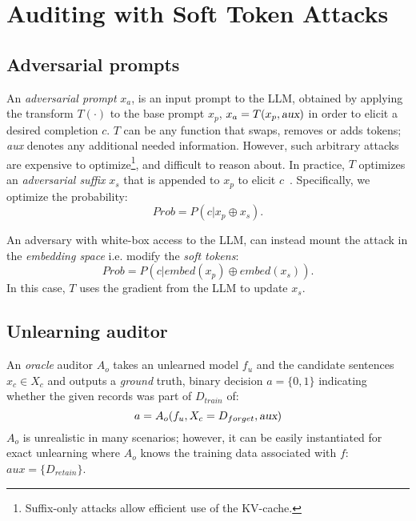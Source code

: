 \section{Auditing with Soft Token Attacks}\label{sec:method}

\subsection{Adversarial prompts}

An \emph{adversarial prompt} $x_a$, is an input prompt to the LLM, obtained by applying the transform $T(\cdot)$ to the base prompt $x_p$, $x_a = T(x_p, \textsl{aux})$ in order to elicit a desired completion $c$.
$T$ can be any function that swaps, removes or adds tokens; \textsl{aux} denotes any additional needed information.
However, such arbitrary attacks are expensive to optimize\footnote{Suffix-only attacks allow efficient use of the KV-cache.}, and difficult to reason about.
In practice, $T$ optimizes an \emph{adversarial suffix} $x_s$ that is appended to $x_p$ to elicit $c$~\cite{zou2023gcg}.
Specifically, we optimize the probability:
\begin{equation}
    Prob = P(c | x_p \oplus x_s).
\end{equation}

An adversary with white-box access to the LLM, can instead mount the attack in the \emph{embedding space} i.e. modify the \emph{soft tokens}:
\begin{equation}
    Prob = P(c | embed(x_p) \oplus embed(x_s)).
\end{equation}
In this case, $T$ uses the gradient from the LLM to update $x_s$.

\subsection{Unlearning auditor}\label{sec:method:framework}

An \emph{oracle} auditor $A_o$ takes an unlearned model $f_u$ and the candidate sentences $x_c \in X_c$ and outputs a \emph{ground} truth, binary decision $a=\{0, 1\}$ indicating whether the given records was part of $D_{train}$ of:
\begin{equation}
    a = A_o(f_u, X_c = D_{forget}, \textsl{aux})
\end{equation}
$A_o$ is unrealistic in many scenarios; however, it can be easily instantiated for exact unlearning where $A_o$ knows the training data associated with $f$: $aux = \{  D_{retain} \}$.

